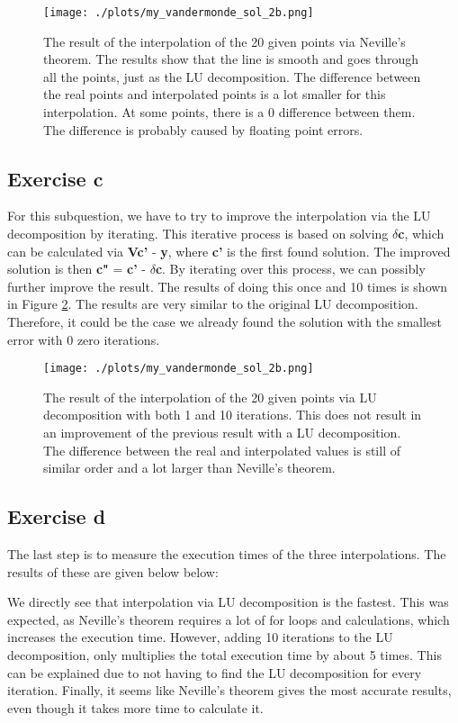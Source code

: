 \begin{figure}[h!]
  \centering
  \texttt{[image: ./plots/my\_vandermonde\_sol\_2b.png]}
  \caption{The result of the interpolation of the 20 given points via Neville's theorem. The results show that the line is smooth and goes through all the points, just as the LU decomposition. The difference between the real points and interpolated points is a lot smaller for this interpolation. At some points, there is a 0 difference between them. The difference is probably caused by floating point errors.}
  \label{fig:2b}
\end{figure}

\subsection{Exercise c}
For this subquestion, we have to try to improve the interpolation via the LU decomposition by iterating. This iterative process is based on solving \textbf{$\delta$c}, which can be calculated via \textbf{Vc'} - \textbf{y}, where \textbf{c'} is the first found solution. The improved solution is then \textbf{c"} = \textbf{c'} - \textbf{$\delta$c}. By iterating over this process, we can possibly further improve the result. The results of doing this once and 10 times is shown in Figure \ref{fig:2c}. The results are very similar to the original LU decomposition. Therefore, it could be the case we already found the solution with the smallest error with 0 zero iterations.

\begin{figure}[h!]
  \centering
  \texttt{[image: ./plots/my\_vandermonde\_sol\_2b.png]}
  \caption{The result of the interpolation of the 20 given points via LU decomposition with both 1 and 10 iterations. This does not result in an improvement of the previous result with a LU decomposition. The difference between the real and interpolated values is still of similar order and a lot larger than Neville's theorem.}
  \label{fig:2c}
\end{figure}

\subsection{Exercise d}

The last step is to measure the execution times of the three interpolations. The results of these are given below below: 

We directly see that interpolation via LU decomposition is the fastest. This was expected, as Neville's theorem requires a lot of for loops and calculations, which increases the execution time. However, adding 10 iterations to the LU decomposition, only multiplies the total execution time by about 5 times. This can be explained due to not having to find the LU decomposition for every iteration. Finally, it seems like Neville's theorem gives the most accurate results, even though it takes more time to calculate it. 

